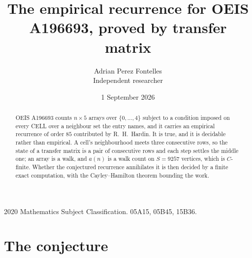\documentclass[11pt,a4paper]{article}
\title{The empirical recurrence for OEIS A196693, proved by transfer matrix}
\author{Adrian Perez Fontelles\\ \small Independent researcher}
\date{1 September 2026}
\theoremstyle{plain}
\theoremstyle{definition}
\begin{document}
\maketitle

\begin{abstract}
OEIS A196693 counts $n\times5$ arrays over $\{0,\dots,4\}$ subject to a condition imposed on
every CELL over a neighbour set the entry names, and it carries an empirical recurrence of
order $85$ contributed by R.~H.~Hardin. It is true, and it is decidable rather than
empirical. A cell's neighbourhood meets three consecutive rows, so the state of a transfer
matrix is a pair of consecutive rows and each step settles the middle one; an array is a
walk, and $a(n)$ is a walk count on $S=9257$ vertices, which is $C$-finite. Whether the
conjectured recurrence annihilates it is then decided by a finite exact computation, with the
Cayley--Hamilton theorem bounding the work.
\end{abstract}

\noindent\small 2020 Mathematics Subject Classification. 05A15, 05B45, 15B36.\normalsize

\section{The conjecture}
\end{document}
